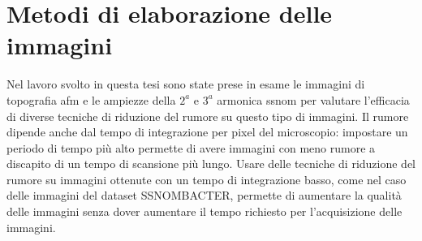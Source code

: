 \documentclass[../main.tex]{subfiles}
\begin{document}
	
	\chapter{Metodi di elaborazione delle immagini}
	
	Nel lavoro svolto in questa tesi sono state prese in esame le immagini di topografia \acrshort{afm} e le ampiezze della $2^a$ e $3^a$ armonica \acrshort{ssnom} per valutare l'efficacia di diverse tecniche di riduzione del rumore su questo tipo di immagini. Il rumore dipende anche dal tempo di integrazione per pixel del microscopio: impostare un periodo di tempo più alto permette di avere immagini con meno rumore a discapito di un tempo di scansione più lungo. Usare delle tecniche di riduzione del rumore su immagini ottenute con un tempo di integrazione basso, come nel caso delle immagini del dataset SSNOMBACTER, permette di aumentare la qualità delle immagini senza dover aumentare il tempo richiesto per l'acquisizione delle immagini.\cite{baiz_2025} 
	
\end{document}
